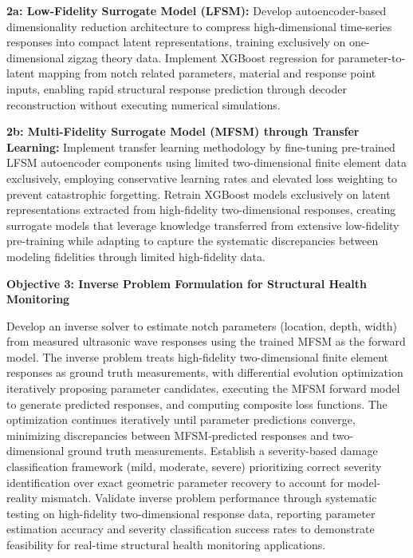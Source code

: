 \documentclass[12pt,a4paper]{report}
\begin{document}
\medskip

\textbf{2a: Low-Fidelity Surrogate Model (LFSM):} Develop autoencoder-based dimensionality reduction architecture to compress high-dimensional time-series responses into compact latent representations, training exclusively on one-dimensional zigzag theory data. Implement XGBoost regression for parameter-to-latent mapping from notch related parameters, material and response point inputs, enabling rapid structural response prediction through decoder reconstruction without executing numerical simulations.

\medskip

\textbf{2b: Multi-Fidelity Surrogate Model (MFSM) through Transfer Learning:} Implement transfer learning methodology by fine-tuning pre-trained LFSM autoencoder components using limited two-dimensional finite element data exclusively, employing conservative learning rates and elevated loss weighting to prevent catastrophic forgetting. Retrain XGBoost models exclusively on latent representations extracted from high-fidelity two-dimensional responses, creating surrogate models that leverage knowledge transferred from extensive low-fidelity pre-training while adapting to capture the systematic discrepancies between modeling fidelities through limited high-fidelity data.


\bigskip

\textbf{Objective 3: Inverse Problem Formulation for Structural Health Monitoring}

\medskip

Develop an inverse solver to estimate notch parameters (location, depth, width) from measured ultrasonic wave responses using the trained MFSM as the forward model. The inverse problem treats high-fidelity two-dimensional finite element responses as ground truth measurements, with differential evolution optimization iteratively proposing parameter candidates, executing the MFSM forward model to generate predicted responses, and computing composite loss functions. The optimization continues iteratively until parameter predictions converge, minimizing discrepancies between MFSM-predicted responses and two-dimensional ground truth measurements. Establish a severity-based damage classification framework (mild, moderate, severe) prioritizing correct severity identification over exact geometric parameter recovery to account for model-reality mismatch. Validate inverse problem performance through systematic testing on high-fidelity two-dimensional response data, reporting parameter estimation accuracy and severity classification success rates to demonstrate feasibility for real-time structural health monitoring applications.
\end{document}
